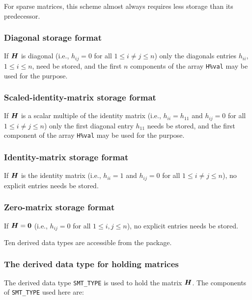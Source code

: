\documentclass{galahad}
\begin{document}
For sparse matrices, this scheme almost always requires less storage than
its predecessor.

\subsubsection{Diagonal storage format}\label{diagonal}
If ${\bm{H}}$ is diagonal (i.e., $h_{ij} = 0$ for all $1 \leq i \neq j \leq n$)
only the diagonals entries $h_{ii}$, $1 \leq i \leq n$,  need be stored,
and the first $n$ components of the array {\tt H\%val} may be used for
the purpose.

\subsubsection{Scaled-identity-matrix storage format}\label{scaled-identity}
If ${\bm{H}}$ is a scalar multiple of the identity matrix
(i.e., $h_{ii} = h_{11}$  and $h_{ij} = 0$ for all $1 \leq i \neq j \leq n$)
only the first diagonal entry $h_{11}$ needs be stored,
and the first component of the array {\tt H\%val} may be used for
the purpose.

\subsubsection{Identity-matrix storage format}\label{identity}
If ${\bm{H}}$ is the identity matrix
(i.e., $h_{ii} = 1$ and $h_{ij} = 0$ for all $1 \leq i \neq j \leq n$),
no explicit entries needs be stored.

\subsubsection{Zero-matrix storage format}\label{zero}
If ${\bm{H}} = {\bm{0}}$ (i.e., $h_{ij} = 0$ for all $1 \leq i, j \leq n$),
no explicit entries needs be stored.








\galtypes
Ten derived data types are accessible from the package.


\subsubsection{The derived data type for holding matrices}\label{typesmt}
The derived data type {\tt SMT\_TYPE} is used to hold the matrix ${\bm{H}}$.
The components of {\tt SMT\_TYPE} used here are:
\end{document}
